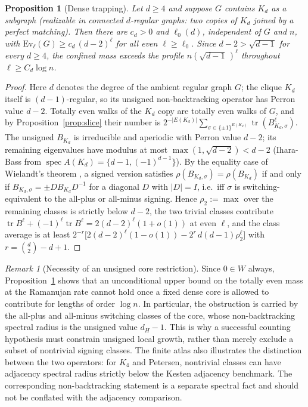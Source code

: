 \documentclass[11pt]{article}
\newtheorem{proposition}[lemma]{Proposition}
\theoremstyle{remark}
\newtheorem{remark}[lemma]{Remark}
\DeclareMathOperator{\tr}{tr}
\begin{document}
\begin{proposition}[Dense trapping]\label{prop:trap}
Let $d\ge4$ and suppose $G$ contains $K_d$ as a subgraph (realizable in
connected $d$-regular graphs: two copies of $K_d$ joined by a perfect
matching). Then there are $c_d>0$ and $\ell_0(d)$, independent of $G$
and $n$, with $\mathrm{Ev}_\ell(G)\ge c_d\,(d-2)^{\ell}$ for all even
$\ell\ge\ell_0$. Since $d-2>\sqrt{d-1}$ for every $d\ge4$, the confined
mass exceeds the profile $n(\sqrt{d-1}\,)^{\ell}$ throughout
$\ell\ge C_d\log n$.
\end{proposition}

\begin{proof}
Here $d$ denotes the degree of the ambient regular graph $G$; the clique $K_d$ itself is
$(d-1)$-regular, so its unsigned non-backtracking operator has Perron value $d-2$.
Totally even walks of the $K_d$ copy are totally even walks of $G$, and
by Proposition~\ref{prop:slice} their number is
$2^{-|E(K_d)|}\sum_{\sigma\in\{\pm1\}^{E(K_d)}}\tr(B_{K_d,\sigma}^\ell)$.
The unsigned $B_{K_d}$ is irreducible and aperiodic with Perron value
$d-2$; its remaining eigenvalues have modulus at most
$\max(1,\sqrt{d-2})<d-2$ (Ihara-Bass from
$\operatorname{spec}A(K_d)=\{d-1,(-1)^{d-1}\}$). By the equality case of
Wielandt's theorem \cite[Thm.~8.3.11]{hornjohnson13}, a signed version satisfies
$\rho(B_{K_d,\sigma})=\rho(B_{K_d})$ if and only if
$B_{K_d,\sigma}=\pm D B_{K_d}D^{-1}$ for a diagonal $D$ with
$|D|=I$, i.e.\ iff $\sigma$ is switching-equivalent to the all-plus or
all-minus signing. Hence $\rho_2:=\max$ over the remaining classes is
strictly below $d-2$, the two trivial classes contribute
$\tr B^\ell+(-1)^\ell\tr B^\ell=2(d-2)^\ell(1+o(1))$ at even $\ell$, and
the class average is at least
$2^{-r}\big[2(d-2)^\ell(1-o(1))-2^{r}\,d(d-1)\rho_2^{\ell}\big]$ with
$r=\binom d2-d+1$.
\end{proof}

\begin{remark}[Necessity of an unsigned core restriction]
Since $0\in W$ always, Proposition~\ref{prop:trap} shows that an unconditional upper
bound on the totally even mass at the Ramanujan rate cannot hold once a fixed dense core
is allowed to contribute for lengths of order $\log n$. In particular, the obstruction is
carried by the all-plus and all-minus switching classes of the core, whose non-backtracking
spectral radius is the unsigned value $d_H-1$. This is why a successful counting hypothesis
must constrain unsigned local growth, rather than merely exclude a subset of nontrivial
signing classes. The finite atlas also illustrates the distinction between the two operators:
for $K_4$ and Petersen, nontrivial classes can have adjacency spectral radius strictly below
the Kesten adjacency benchmark. The corresponding non-backtracking statement is a separate
spectral fact and should not be conflated with the adjacency comparison.
\end{remark}
\end{document}
